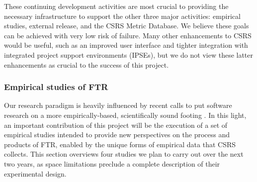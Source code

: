 These continuing development activities are most crucial to providing the
necessary infrastructure to support the other three major activities:
empirical studies, external release, and the CSRS Metric Database.  We
believe these goals can be achieved with very low risk of failure.  Many
other enhancements to CSRS would be useful, such as an improved user
interface and tighter integration with integrated project support
environments (IPSEs), but we do not view these latter enhancements as
crucial to the success of this project.

\subsubsection{Empirical studies of FTR}

Our research paradigm is heavily influenced by recent calls to put software
research on a more empirically-based, scientifically sound footing
\cite{Tichy93,Berry92,Cohen88,Basili86,Basili84}.  In this light, an
important contribution of this project will be the execution of a set of
empirical studies intended to provide new perspectives on the process and
products of FTR, enabled by the unique forms of empirical data that CSRS
collects.  This section overviews four studies we plan to carry out over
the next two years, as space limitations preclude a complete description of
their experimental design.

